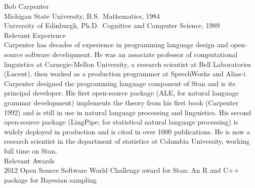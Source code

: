 \vspace*{12pt}

\noindent
{\sc Bob Carpenter}
\\[2pt]
Michigan State University, B.S.\ Mathematics, 1984
\\
University of Edinburgh, Ph.D.\ Cognitive and Computer Science, 1989
\\

\noindent
{\sc Relevant Experience}
\\[3pt]
Carpenter has decades of experience in programming language design and
open-source software development.  He was an associate professor of
computational linguistics at Carnegie-Mellon University, a research
scientist at Bell Laboratories (Lucent), then worked as a production
programmer at SpeechWorks and Alias-i.  Carpenter designed the
programming language component of Stan and is its principal developer.
His first open-source package (ALE, for natural language grammar
development) implements the theory from his first book (Carpenter
1992) and is still in use in natural language processing and
linguistics.  His second open-source package (LingPipe; for
statistical natural language processing) is widely deployed in
production and is cited in over 1000 publications.  He is now a
research scientist in the department of statistics at Columbia
University, working full time on Stan.
\\

\noindent
{\sc Relevant Awards}
\\[2pt]
2012 Open Source Software World Challenge award for Stan: An R and C++
package for Bayesian sampling

\vspace*{12pt}

